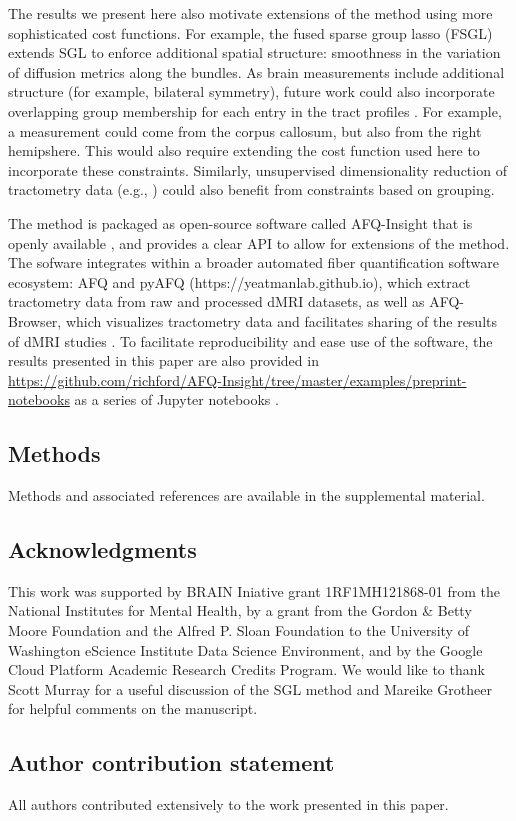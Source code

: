 \documentclass[10pt,%
               aps,%
               prl,%
               preprint,%
               superscriptaddress,%
               preprintnumbers,%
               amsmath,%
               floatfix,%
               endfloats*]{revtex4-1}
\begin{document}
The results we present here also motivate extensions of the method using more
sophisticated cost functions. For example, the fused sparse group lasso (FSGL)
\cite{zhou2012} extends SGL to enforce additional spatial structure: smoothness
in the variation of diffusion metrics along the bundles. As brain measurements
include additional structure (for example, bilateral symmetry), future work
could also incorporate overlapping group membership for each entry in the tract
profiles \cite{Rao2014-xm}. For example, a measurement could come from the
corpus callosum, but also from the right hemipshere. This would also require
extending the cost function used here to incorporate these constraints.
Similarly, unsupervised dimensionality reduction of tractometry data (e.g.,
\cite{Chamberland2019-mu}) could also benefit from constraints based on
grouping.

The method is packaged as open-source software called AFQ-Insight that is
openly available , and provides a clear API to allow for
extensions of the method. The sofware integrates within a broader automated
fiber quantification software ecosystem: AFQ \cite{yeatman2012tract} and
pyAFQ (https://yeatmanlab.github.io), which extract tractometry data from raw
and processed dMRI datasets, as well as AFQ-Browser, which visualizes
tractometry data and facilitates sharing of the results of dMRI studies
\cite{yeatman2018browser}. To facilitate reproducibility and ease use of the
software, the results presented in this paper are also provided in
\url{https://github.com/richford/AFQ-Insight/tree/master/examples/preprint-notebooks}
as a series of Jupyter notebooks \cite{kluyver2016jupyter}.

\subsection*{Methods}

Methods and associated references are available in the supplemental material.

\subsection*{Acknowledgments}

This work was supported by BRAIN Iniative grant 1RF1MH121868-01 from the
National Institutes for Mental Health, by a grant from the Gordon \& Betty
Moore Foundation and the Alfred P. Sloan Foundation to the University of
Washington eScience Institute Data Science Environment, and by the Google
Cloud Platform Academic Research Credits Program. We would like to thank
Scott Murray for a useful discussion of the SGL method and Mareike Grotheer
for helpful comments on the manuscript.

\subsection*{Author contribution statement}

All authors contributed extensively to the work presented in this paper.

\printfigures



\end{document}

